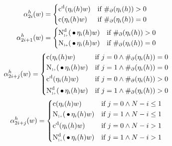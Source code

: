 \begin{subequations}
  \begin{align}
    \SumArg_{2 i}^h(w) &=
      \begin{dcases*}
        \DiscountedCount(\History_i(h) w)        & if $\#_\partial(\History_i(h)) > 0$ \\
        \Count(\History_i(h) w)                  & if $\#_\partial(\History_i(h)) = 0$
      \end{dcases*} \\
    \SumArg_{2 i + 1}^h(w) &=
      \begin{dcases*}
        \DiscountedCount*(\WSkp \History_i(h) w) & if $\#_\partial(\History_i(h)) > 0$ \\
        \ContCountIp(\WSkp \History_i(h) w)      & if $\#_\partial(\History_i(h)) = 0$
      \end{dcases*}
  \end{align}
\end{subequations}
\begin{equation}
  \SumArg_{2 i + j}^h(w) =
    \begin{dcases*}
      \Count(\History_i(h) w)                  & if $j = 0 \land \#_\partial(\History_i(h)) = 0$ \\
      \ContCountIp(\WSkp \History_i(h) w)      & if $j = 1 \land \#_\partial(\History_i(h)) = 0$ \\
      \DiscountedCount(\History_i(h) w)        & if $j = 0 \land \#_\partial(\History_i(h)) > 0$ \\
      \DiscountedCount*(\WSkp \History_i(h) w) & if $j = 1 \land \#_\partial(\History_i(h)) > 0$
    \end{dcases*}
\end{equation}
\begin{equation}
  \SumArg_{2 i + j}^h(w) =
    \begin{dcases*}
      \Count(\History_i(h) w)                  & if $j = 0 \land N - i \leq 1$ \\
      \ContCountIp(\WSkp \History_i(h) w)      & if $j = 1 \land N - i \leq 1$ \\
      \DiscountedCount(\History_i(h) w)        & if $j = 0 \land N - i > 1$ \\
      \DiscountedCount*(\WSkp \History_i(h) w) & if $j = 1 \land N - i > 1$
    \end{dcases*}
\end{equation}

